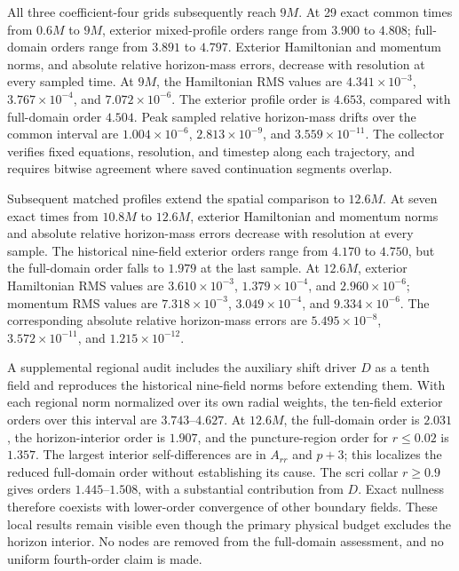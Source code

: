\documentclass[11pt]{article}
\begin{document}
All three coefficient-four grids subsequently reach $9M$. At 29 exact common times from $0.6M$ to $9M$, exterior mixed-profile orders range from $3.900$ to $4.808$; full-domain orders range from $3.891$ to $4.797$. Exterior Hamiltonian and momentum norms, and absolute relative horizon-mass errors, decrease with resolution at every sampled time. At $9M$, the Hamiltonian RMS values are $4.341\times10^{-3}$, $3.767\times10^{-4}$, and $7.072\times10^{-6}$. The exterior profile order is $4.653$, compared with full-domain order $4.504$. Peak sampled relative horizon-mass drifts over the common interval are $1.004\times10^{-6}$, $2.813\times10^{-9}$, and $3.559\times10^{-11}$. The collector verifies fixed equations, resolution, and timestep along each trajectory, and requires bitwise agreement where saved continuation segments overlap.

Subsequent matched profiles extend the spatial comparison to $12.6M$. At seven exact times from $10.8M$ to $12.6M$, exterior Hamiltonian and momentum norms and absolute relative horizon-mass errors decrease with resolution at every sample. The historical nine-field exterior orders range from $4.170$ to $4.750$, but the full-domain order falls to $1.979$ at the last sample. At $12.6M$, exterior Hamiltonian RMS values are $3.610\times10^{-3}$, $1.379\times10^{-4}$, and $2.960\times10^{-6}$; momentum RMS values are $7.318\times10^{-3}$, $3.049\times10^{-4}$, and $9.334\times10^{-6}$. The corresponding absolute relative horizon-mass errors are $5.495\times10^{-8}$, $3.572\times10^{-11}$, and $1.215\times10^{-12}$.

A supplemental regional audit includes the auxiliary shift driver $D$ as a tenth field and reproduces the historical nine-field norms before extending them. With each regional norm normalized over its own radial weights, the ten-field exterior orders over this interval are $3.743$--$4.627$. At $12.6M$, the full-domain order is $2.031$, the horizon-interior order is $1.907$, and the puncture-region order for $r\leq0.02$ is $1.357$. The largest interior self-differences are in $A_{rr}$ and $p+3$; this localizes the reduced full-domain order without establishing its cause. The scri collar $r\geq0.9$ gives orders $1.445$--$1.508$, with a substantial contribution from $D$. Exact nullness therefore coexists with lower-order convergence of other boundary fields. These local results remain visible even though the primary physical budget excludes the horizon interior. No nodes are removed from the full-domain assessment, and no uniform fourth-order claim is made.
\end{document}
